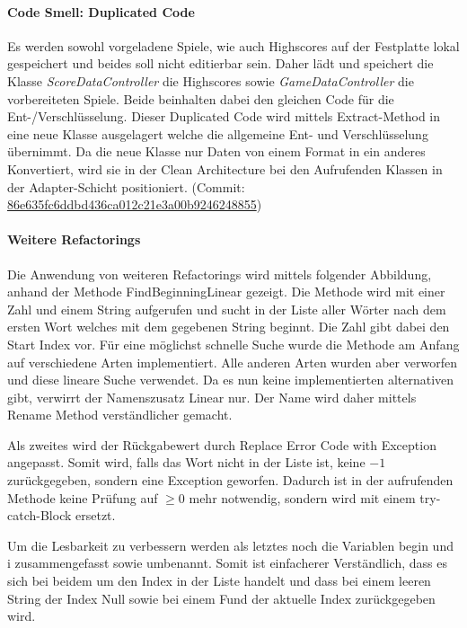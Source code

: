 \newpage
\paragraph{Code Smell: Duplicated Code}

Es werden sowohl vorgeladene Spiele, wie auch Highscores auf der Festplatte lokal gespeichert und beides soll nicht editierbar sein. Daher lädt und speichert die Klasse \textit{ScoreDataController} die Highscores sowie \textit{GameDataController} die vorbereiteten Spiele. Beide beinhalten dabei den gleichen Code für die Ent-/Verschlüsselung. Dieser Duplicated Code wird mittels Extract-Method in eine neue Klasse ausgelagert welche die allgemeine Ent- und Verschlüsselung übernimmt. Da die neue Klasse nur Daten von einem Format in ein anderes Konvertiert, wird sie in der Clean Architecture bei den Aufrufenden Klassen in der Adapter-Schicht positioniert. (Commit: \href{https://github.com/EinToni/Wortfinder/commit/86e635fc6ddbd436ca012c21e3a00b9246248855}{86e635fc6ddbd436ca012c21e3a00b9246248855})

\paragraph{Weitere Refactorings}
Die Anwendung von weiteren Refactorings wird mittels folgender Abbildung, anhand der Methode \glqq FindBeginningLinear\grqq{} gezeigt. Die Methode wird mit einer Zahl und einem String aufgerufen und sucht in der Liste aller Wörter nach dem ersten Wort welches mit dem gegebenen String beginnt. Die Zahl gibt dabei den Start Index vor. Für eine möglichst schnelle Suche wurde die Methode am Anfang auf verschiedene Arten implementiert. Alle anderen Arten wurden aber verworfen und diese lineare Suche verwendet. Da es nun keine implementierten alternativen gibt, verwirrt der Namenszusatz \glqq Linear\grqq{} nur. Der Name wird daher mittels \glqq Rename Method\grqq{} verständlicher gemacht. 

Als zweites wird der Rückgabewert durch \glqq Replace Error Code with Exception\grqq{} angepasst. Somit wird, falls das Wort nicht in der Liste ist, keine $-1$ zurückgegeben, sondern eine Exception geworfen. Dadurch ist in der aufrufenden Methode keine Prüfung auf $\ge 0$ mehr notwendig, sondern wird mit einem try-catch-Block ersetzt.

Um die Lesbarkeit zu verbessern werden als letztes noch die Variablen \glqq begin\grqq{} und \glqq i\grqq{} zusammengefasst sowie umbenannt. Somit ist einfacherer Verständlich, dass es sich bei beidem um den Index in der Liste handelt und dass bei einem leeren String der Index Null sowie bei einem Fund der aktuelle Index zurückgegeben wird. 

